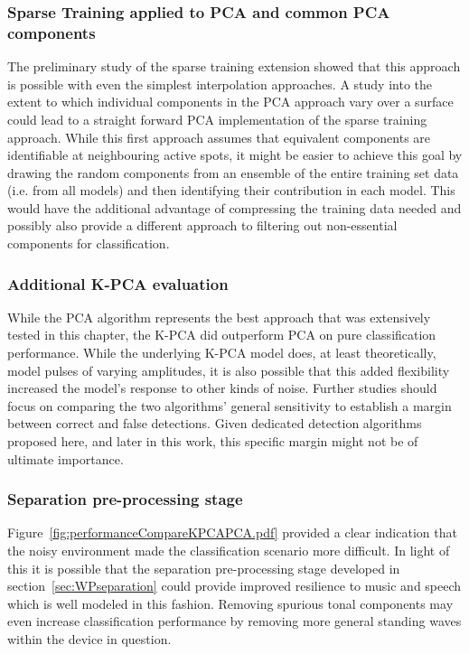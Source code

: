 \subsubsection{Sparse Training applied to PCA and common PCA components}
The preliminary study of the sparse training extension showed that this approach is possible with even the simplest interpolation approaches. A study into the extent to which individual components in the PCA approach vary over a surface could lead to a straight forward PCA implementation of the sparse training approach. While this first approach assumes that equivalent components are identifiable at neighbouring active spots, it might be easier to achieve this goal by drawing the random components from an ensemble of the entire training set data (i.e. from all models) and then identifying their contribution in each model. This would have the additional advantage of compressing the training data needed and possibly also provide a different approach to filtering out non-essential components for classification.

\subsubsection{Additional K-PCA evaluation}
While the PCA algorithm represents the best approach that was extensively tested in this chapter, the K-PCA did outperform PCA on pure classification performance. While the underlying K-PCA model does, at least theoretically, model pulses of varying amplitudes, it is also possible that this added flexibility increased the model's response to other kinds of noise. Further studies should focus on comparing the two algorithms' general sensitivity to establish a margin between correct and false detections. Given dedicated detection algorithms proposed here, and later in this work, this specific margin might not be of ultimate importance.

\subsubsection{Separation pre-processing stage}
Figure~\ref{fig:performanceCompareKPCAPCA.pdf} provided a clear indication that the noisy environment made the classification scenario more difficult. In light of this it is possible that the separation pre-processing stage developed in section~\ref{sec:WPseparation} could provide improved resilience to music and speech which is well modeled in this fashion. Removing spurious tonal components may even increase classification performance by removing more general standing waves within the device in question.


